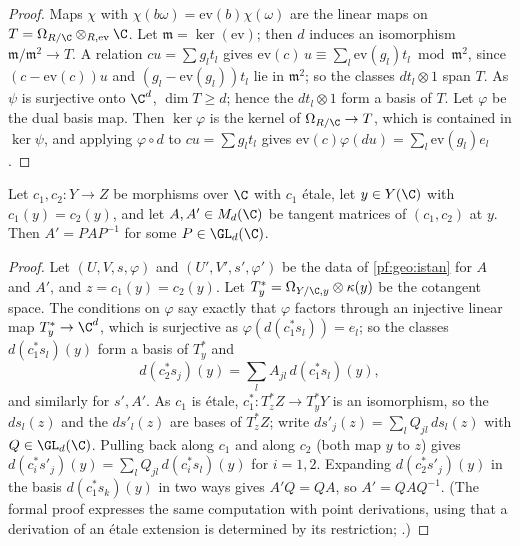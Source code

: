 \begin{proof}
Maps $\chi$ with $\chi(b\omega)=\mathrm{ev}(b)\chi(\omega)$ are the linear maps on $T=\Omega_{R/\C}\otimes_{R,\mathrm{ev}}\C$. Let
$\mathfrak m=\ker(\mathrm{ev})$; then $d$ induces an isomorphism $\mathfrak m/\mathfrak m^2\to T$. A relation $cu=\sum g_lt_l$ gives
$\mathrm{ev}(c)\,u\equiv\sum_l\mathrm{ev}(g_l)t_l\bmod\mathfrak m^2$, since $(c-\mathrm{ev}(c))u$ and $(g_l-\mathrm{ev}(g_l))t_l$ lie in $\mathfrak m^2$; so the
classes $dt_l\otimes1$ span $T$. As $\psi$ is surjective onto $\C^d$, $\dim T\ge d$; hence the $dt_l\otimes1$ form a basis of $T$. Let $\varphi$ be the dual
basis map. Then $\ker\varphi$ is the kernel of $\Omega_{R/\C}\to T$, which is contained in $\ker\psi$, and applying $\varphi\circ d$ to $cu=\sum g_lt_l$ gives
$\mathrm{ev}(c)\varphi(du)=\sum_l\mathrm{ev}(g_l)e_l$.
\end{proof}

\begin{lemma}\label{pf:hlf-cech:tanconj}
Let $c_1,c_2\colon Y\to Z$ be morphisms over $\C$ with $c_1$ \'etale, let $y\in Y(\C)$ with $c_1(y)=c_2(y)$, and let $A,A'\in M_d(\C)$ be tangent
matrices of $(c_1,c_2)$ at $y$. Then $A'=PAP^{-1}$ for some $P\in\GL_d(\C)$.
\end{lemma}

\begin{proof}
Let $(U,V,s,\varphi)$ and $(U',V',s',\varphi')$ be the data of \cref{pf:geo:istan} for $A$ and $A'$, and $z=c_1(y)=c_2(y)$. Let $T^*_y=\Omega_{Y/\C,y}\otimes\kappa(y)$
be the cotangent space. The conditions on $\varphi$ say exactly that $\varphi$ factors through an injective linear map $T^*_y\to\C^d$, which is surjective
as $\varphi(d(c_1^*s_l))=e_l$; so the classes $d(c_1^*s_l)(y)$ form a basis of $T^*_y$ and
\[
  d(c_2^*s_j)(y)=\sum_lA_{jl}\,d(c_1^*s_l)(y),
\]
and similarly for $s',A'$. As $c_1$ is \'etale, $c_1^*\colon T^*_zZ\to T^*_yY$ is an isomorphism, so the $ds_l(z)$ and the $ds'_l(z)$ are bases of $T^*_zZ$;
write $ds'_j(z)=\sum_lQ_{jl}\,ds_l(z)$ with $Q\in\GL_d(\C)$. Pulling back along $c_1$ and along $c_2$ (both map $y$ to $z$) gives
$d(c_i^*s'_j)(y)=\sum_lQ_{jl}\,d(c_i^*s_l)(y)$ for $i=1,2$. Expanding $d(c_2^*s'_j)(y)$ in the basis $d(c_1^*s_k)(y)$ in two ways gives $A'Q=QA$, so
$A'=QAQ^{-1}$. (The formal proof expresses the same computation with point derivations, using that a derivation of an \'etale extension is
determined by its restriction; .)
\end{proof}

